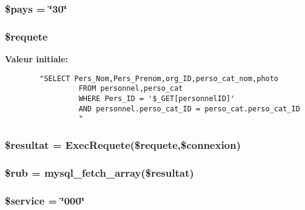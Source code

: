 \hypertarget{passeport_8php_a4}{
\subsubsection[\$pays]{\setlength{\rightskip}{0pt plus 5cm}\$pays = \char`\"{}30\char`\"{}}}
\label{passeport_8php_a4}


\hypertarget{passeport_8php_a1}{
\subsubsection[\$requete]{\setlength{\rightskip}{0pt plus 5cm}\$requete}}
\label{passeport_8php_a1}


{\bf Valeur initiale:}

\footnotesize\begin{verbatim}        "SELECT Pers_Nom,Pers_Prenom,org_ID,perso_cat_nom,photo
                 FROM personnel,perso_cat
                 WHERE Pers_ID = '$_GET[personnelID]'
                 AND personnel.perso_cat_ID = perso_cat.perso_cat_ID
                 "
\end{verbatim}\normalsize 
\hypertarget{passeport_8php_a2}{
\subsubsection[\$resultat]{\setlength{\rightskip}{0pt plus 5cm}\$resultat = Exec\-Requete(\$requete,\$connexion)}}
\label{passeport_8php_a2}


\hypertarget{passeport_8php_a3}{
\subsubsection[\$rub]{\setlength{\rightskip}{0pt plus 5cm}\$rub = mysql\_\-fetch\_\-array(\$resultat)}}
\label{passeport_8php_a3}


\hypertarget{passeport_8php_a6}{
\subsubsection[\$service]{\setlength{\rightskip}{0pt plus 5cm}\$service = \char`\"{}000\char`\"{}}}
\label{passeport_8php_a6}


